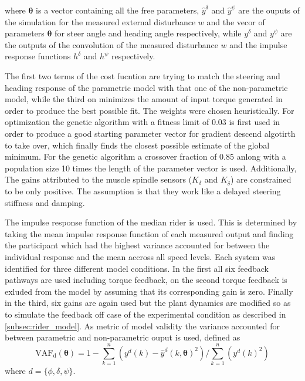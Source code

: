 where \ensuremath{\mathbf{\theta}} is a vector containing all the free parameters, \ensuremath{\hat{y}^{\delta}} and \ensuremath{\hat{y}^{\psi}} are the ouputs of the simulation for the measured external disturbance \ensuremath{w} and the vecor of parameters  \ensuremath{\mathbf{\theta}} for steer angle and heading angle respectively, while \ensuremath{y^\delta} and \ensuremath{y^\psi} are the outputs of the convolution of the measured disturbance \ensuremath{w} and the impulse response functions \ensuremath{h^\delta} and \ensuremath{h^\psi} respectively. 

The first two terms  of the cost fucntion are trying to match the steering and heading  response of the parametric model with that one of the non-parametric model, while the third on minimizes the amount of input torque generated in order to produce the best possible fit. The weights were chosen heuristically. For optimization the genetic algorithm with a fitness limit of 0.03 is first  used in order to produce a good starting parameter vector for gradient descend algotirth to take over, which finally finds the closest possible estimate of the global minimum. For the genetic algorithm a crossover fraction of 0.85  anlong with a population size 10 times the length of the parameter vector is used. Additionally, The gains attributed to the muscle spindle sensors (\ensuremath{K_\delta} and \ensuremath{K_{\dot{\delta}}}) are constrained to be only positive. The assumption is that they work like a delayed steering stiffness and damping.

The impulse response function of the median rider is used. This is determined by taking the mean impulse response function of each measured output and finding the participant which had the highest variance accounted for between the individual response and the mean accross all speed levels.
Each system was identified for three different model conditions. In the first all six feedback pathways are used including torque feedback, on the second torque feedback is exluded from the model by assuming that its corresponding gain is zero. Finally in the third, six gains are again used but the plant dynamics are modified so as to simulate the feedback off case of the experimental condition as described in \cref{subsec:rider_model}.  As metric of model validity the variance accounted for between parametric and non-parametric ouput is used, defined as
\begin{equation}
\mathrm{VAF_d}(\boldsymbol{\theta})=1 -\sum_{k=1}^{n}\left(y^{d}(k)-\hat{y}^{d}(k, \boldsymbol{\theta})^{2}\right) / \sum_{k=1}^{n}\left(y^{d}(k)^{2}\right)
\end{equation} 
where \ensuremath{d=\{\phi,\delta,\psi\}}. 


